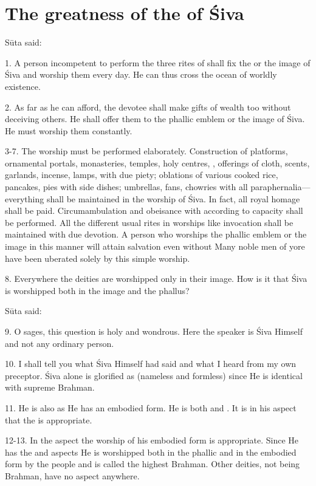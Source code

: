 \chapter{The greatness of the  of Śiva}

Sūta said:

1. A person incompetent to perform the three rites of  \etc shall
fix the  or the image of Śiva and worship them every day. He can thus
cross the ocean of worldly existence.

2. As far as he can afford, the devotee shall make gifts of wealth too without
deceiving others. He shall offer them to the phallic emblem or the image of Śiva.
He must worship them constantly.

3-7. The worship must be performed elaborately. Construction of platforms,
ornamental portals, monasteries, temples, holy centres, \etc, offerings of cloth,
scents, garlands, incense, lamps, with due piety; oblations of various cooked
rice, pancakes, pies \etc with side dishes; umbrellas, fans, chowries with all
paraphernalia—everything shall be maintained in the worship of Śiva. In fact,
all royal homage shall be paid. Circumambulation and obeisance with 
according to capacity shall be performed. All the different usual rites in
worships like invocation shall be maintained with due devotion. A person who
worships the phallic emblem or the image in this manner will attain salvation
even without  \etc Many noble men of yore have been uberated solely
by this simple worship.

8. Everywhere the deities are worshipped only in their image. How is it that
Śiva is worshipped both in the image and the phallus?

Sūta said:

9. O sages, this question is holy and wondrous. Here the speaker is Śiva Himself
and not any ordinary person.

10. I shall tell you what Śiva Himself had said and what I heard from my own
preceptor. Śiva alone is glorified as  (nameless and formless) since
He is identical with supreme Brahman.

11. He is also  as He has an embodied form. He is both 
and . It is in his  aspect that the 
is appropriate.

12-13. In the  aspect the worship of his embodied form is appropriate.
Since He has the  and  aspects He is worshipped both in
the phallic and in the embodied form by the people and is called the highest
Brahman. Other deities, not being Brahman, have no  aspect anywhere.

